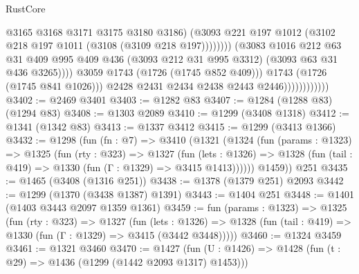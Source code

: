 \begin{lexlean}{RustCore}
\begin{coremodule}
                                              @3165
                                              @3168
                                              @3171
                                              @3175
                                              @3180
                                              @3186)
                                            (@3093
                                              @221
                                              @197
                                              @1012
                                              (@3102 @218 @197 @1011 (@3108 (@3109 @218 @197))))))))
                                    (@3083
                                      @1016
                                      @212
                                      @63
                                      @31
                                      @409
                                      @995
                                      @409
                                      @436
                                      (@3093 @212 @31 @995 @3312)
                                      (@3093 @63 @31 @436 @3265))))
                                @3059
                                @1743
                                (@1726 (@1745 @852 @409)))
                              @1743
                              (@1726 (@1745 @841 @1026)))
                            @2428
                            @2431
                            @2434
                            @2438
                            @2443
                            @2446))))))))))))
@3402 := @2469 @3401
@3403 := @1282 @83
@3407 := @1284 (@1288 @83) (@1294 @83)
@3408 := @1303 @2089
@3410 := @1299 (@3408 @1318)
@3412 := @1341 (@1342 @83)
@3413 := @1337 @3412
@3415 := @1299 (@3413 @1366)
@3432 := @1298
    (fun (fn : @7) =>
    @3410
      (@1321
        (@1324
          (fun (params : @1323) =>
          @1325
            (fun (rty : @323) =>
            @1327
              (fun (lets : @1326) =>
              @1328 (fun (tail : @419) => @1330 (fun (Γ : @1329) => @3415 @1413))))))
        @1459))
    @251
@3435 := @1465 (@3408 (@1316 @251))
@3438 := @1378 (@1379 @251) @2093
@3442 := @1299 (@1370 (@3438 @1387) @1391)
@3443 := @1404 @251
@3448 := @1401 (@1403 @3443 @2097 @1359 @1361)
@3459 := fun (params : @1323) =>
  @1325
    (fun (rty : @323) =>
    @1327
      (fun (lets : @1326) =>
      @1328 (fun (tail : @419) => @1330 (fun (Γ : @1329) => @3415 (@3442 @3448)))))
@3460 := @1324 @3459
@3461 := @1321 @3460
@3470 := @1427 (fun (U : @1426) => @1428 (fun (t : @29) => @1436 (@1299 (@1442 @2093 @1317) @1453)))

\end{coremodule}
\end{lexlean}
